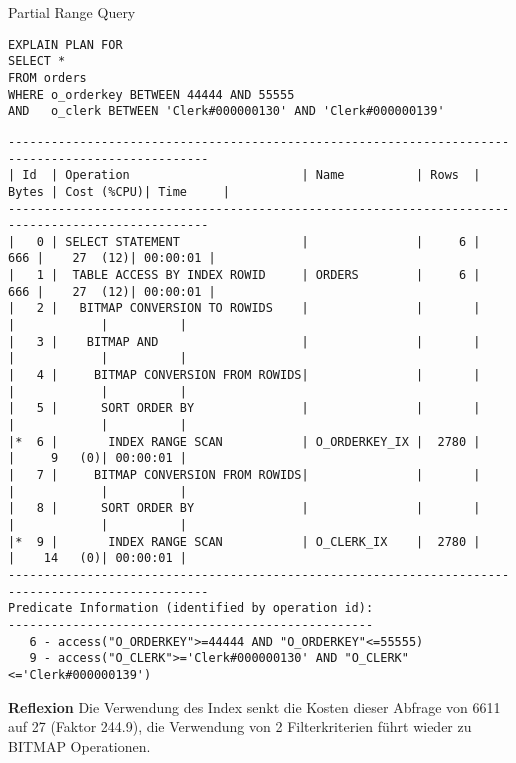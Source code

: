 \documentclass[10pt]{article}
\begin{document}
Partial Range Query
\begin{lstlisting}[style=sql]
EXPLAIN PLAN FOR
SELECT *
FROM orders
WHERE o_orderkey BETWEEN 44444 AND 55555
AND   o_clerk BETWEEN 'Clerk#000000130' AND 'Clerk#000000139'
\end{lstlisting}
\begin{lstlisting}[style=queryexecutionplan]
--------------------------------------------------------------------------------------------------
| Id  | Operation                        | Name          | Rows  | Bytes | Cost (%CPU)| Time     |
--------------------------------------------------------------------------------------------------
|   0 | SELECT STATEMENT                 |               |     6 |   666 |    27  (12)| 00:00:01 |
|   1 |  TABLE ACCESS BY INDEX ROWID     | ORDERS        |     6 |   666 |    27  (12)| 00:00:01 |
|   2 |   BITMAP CONVERSION TO ROWIDS    |               |       |       |            |          |
|   3 |    BITMAP AND                    |               |       |       |            |          |
|   4 |     BITMAP CONVERSION FROM ROWIDS|               |       |       |            |          |
|   5 |      SORT ORDER BY               |               |       |       |            |          |
|*  6 |       INDEX RANGE SCAN           | O_ORDERKEY_IX |  2780 |       |     9   (0)| 00:00:01 |
|   7 |     BITMAP CONVERSION FROM ROWIDS|               |       |       |            |          |
|   8 |      SORT ORDER BY               |               |       |       |            |          |
|*  9 |       INDEX RANGE SCAN           | O_CLERK_IX    |  2780 |       |    14   (0)| 00:00:01 |
--------------------------------------------------------------------------------------------------
Predicate Information (identified by operation id):
---------------------------------------------------
   6 - access("O_ORDERKEY">=44444 AND "O_ORDERKEY"<=55555)
   9 - access("O_CLERK">='Clerk#000000130' AND "O_CLERK"<='Clerk#000000139')
\end{lstlisting}
\textbf{Reflexion} \newline
Die Verwendung des Index senkt die Kosten dieser Abfrage von 6611 auf 27 (Faktor 244.9), die Verwendung von 2 Filterkriterien führt wieder zu BITMAP Operationen.
\end{document}
